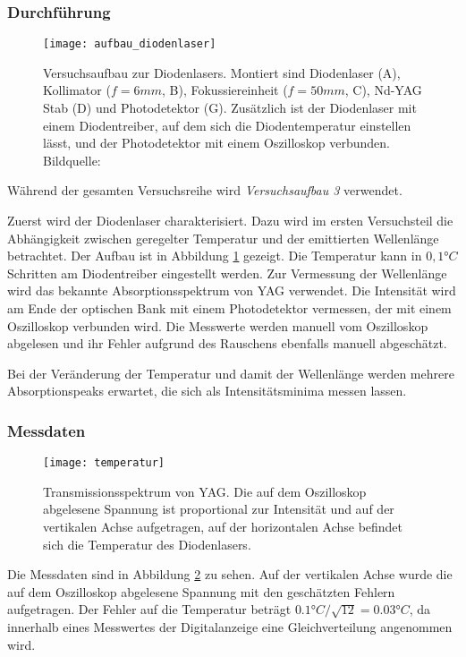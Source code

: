 \documentclass{../Misc/MontavonLaTeX/Montavon}
\newcommand{\fullwidth}{1.0\textwidth}
\begin{document}
\subsubsection{Durchführung}
\begin{figure}[htbp]
\centering
\texttt{[image: aufbau\_diodenlaser]}
\caption{Versuchsaufbau zur Diodenlasers. Montiert sind Diodenlaser (A), Kollimator ($f = 6 \unit{mm}$, B), Fokussiereinheit ($f = 50 \unit{mm}$, C), Nd-YAG Stab (D) und Photodetektor (G). Zusätzlich ist der Diodenlaser mit einem Diodentreiber, auf dem sich die Diodentemperatur einstellen lässt, und der Photodetektor mit einem Oszilloskop verbunden. Bildquelle: \cite[S. 33]{anleitung1}}
\label{fig:aufbau_diodenlaser}
\end{figure}


Während der gesamten Versuchsreihe wird \emph{Versuchsaufbau 3} verwendet. 

Zuerst wird der Diodenlaser charakterisiert. Dazu wird im ersten Versuchsteil die Abhängigkeit zwischen geregelter Temperatur und der emittierten Wellenlänge betrachtet. Der Aufbau ist in Abbildung \ref{fig:aufbau_diodenlaser} gezeigt.
Die Temperatur kann in $0,1 \unit{\degree C}$ Schritten am Diodentreiber eingestellt werden. Zur Vermessung der Wellenlänge wird das bekannte Absorptionsspektrum von YAG verwendet. Die Intensität wird am Ende der optischen Bank mit einem Photodetektor vermessen, der mit einem Oszilloskop verbunden wird. Die Messwerte werden manuell vom Oszilloskop abgelesen und ihr Fehler aufgrund des Rauschens ebenfalls manuell abgeschätzt.

Bei der Veränderung der Temperatur und damit der Wellenlänge werden mehrere Absorptionspeaks erwartet, die sich als Intensitätsminima messen lassen. 

\subsubsection{Messdaten}
\begin{figure}[htbp]
\centering
\texttt{[image: temperatur]}
\caption{Transmissionsspektrum von YAG. Die auf dem Oszilloskop abgelesene Spannung ist proportional zur Intensität und auf der vertikalen Achse aufgetragen, auf der horizontalen Achse befindet sich die Temperatur des Diodenlasers.}
\label{fig:temperatur}
\end{figure}

Die Messdaten sind in Abbildung \ref{fig:temperatur} zu sehen. Auf der vertikalen Achse wurde die auf dem Oszilloskop abgelesene Spannung mit den geschätzten Fehlern aufgetragen. Der Fehler auf die Temperatur beträgt $0.1 \unit{\degree C} / \sqrt{12} = 0.03 \unit{\degree C}$, da innerhalb eines Messwertes der Digitalanzeige eine Gleichverteilung angenommen wird.
\end{document}

